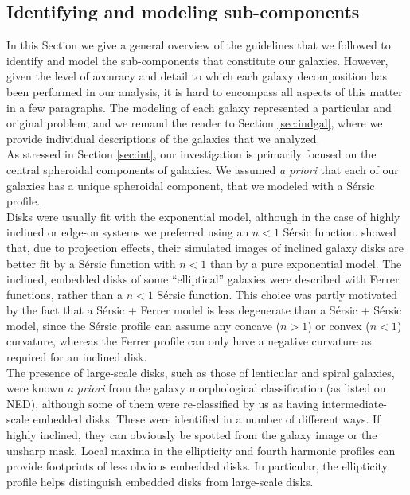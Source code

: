 \documentclass[preprint2]{emulateapj}
\begin{document}
\subsection{Identifying and modeling sub-components}
\label{sec:cpts}
In this Section we give a general overview of the guidelines that we followed to identify and model 
the sub-components that constitute our galaxies. 
However, given the level of accuracy and detail to which each galaxy decomposition has been performed in our analysis,
it is hard to encompass all aspects of this matter in a few paragraphs.
The modeling of each galaxy represented a particular and original problem, 
and we remand the reader to Section \ref{sec:indgal},
where we provide individual descriptions of the galaxies that we analyzed. \\
As stressed in Section \ref{sec:int}, our investigation is primarily focused on the central spheroidal components 
of galaxies.
We assumed \emph{a priori} that each of our galaxies has a unique spheroidal component, 
that we modeled with a S\'ersic profile. \\
Disks were usually fit with the exponential model, 
although in the case of highly inclined or edge-on systems we preferred using an $n < 1$ S\'ersic function. 
\citet{pastrav2013a,pastrav2013b} showed that, due to projection effects, their simulated images of inclined galaxy disks 
are better fit by a S\'ersic function with $n < 1$ than by a pure exponential model.
The inclined, embedded disks of some ``elliptical'' galaxies were described with Ferrer functions, rather than a $n < 1$ S\'ersic function. 
This choice was partly motivated by the fact that a S\'ersic + Ferrer model is less degenerate than a S\'ersic + S\'ersic model, 
since the S\'ersic profile can assume any concave ($n > 1$) or convex ($n < 1$) curvature, 
whereas the Ferrer profile can only have a negative curvature as required for an inclined disk. \\
The presence of large-scale disks, such as those of lenticular and spiral galaxies, 
were known \emph{a priori} from the galaxy morphological classification (as listed on NED), 
although some of them were re-classified by us as having intermediate-scale embedded disks.
These were identified in a number of different ways. 
If highly inclined, they can obviously be spotted from the galaxy image or the unsharp mask.
Local maxima in the ellipticity and fourth harmonic profiles 
can provide footprints of less obvious embedded disks.
In particular, the ellipticity profile helps distinguish embedded disks from large-scale disks.
\end{document}
